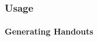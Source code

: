 \documentclass[%
  aspectratio=169,
  9pt,
  USenglish,
  light,
  mathserif,
  professionalfont,
  titlegraphic,
  progressbar,
]{beamer}
\begin{document}
\begin{frame}[fragile]
  \frametitle{Usage}
  \framesubtitle{Generating Handouts}
%   
  \begin{columns}[onlytextwidth]
      \inputminted[fontsize=\tiny]{latex}{minimal_handout.tex}
      \centering
  \end{columns}
\end{frame}


\end{document}
